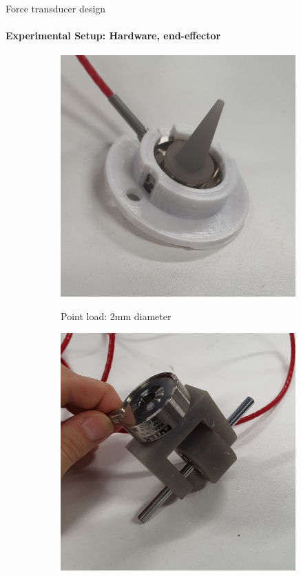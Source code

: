 \documentclass[aspectratio=169]{beamer}
\begin{document}
\begin{frame}[t]{Force transducer design}
    \framesubtitle{Experimental Setup: Hardware, end-effector}
    \begin{figure}[H]
        \begin{subfigure}[t]{0.29\textwidth}
            \centering\includegraphics[width=0.99\textwidth]{point_load.JPG}\\
            \caption*{Point load: 2mm diameter}
            \label{fig:point_load}
        \end{subfigure}
        \begin{subfigure}[t]{0.29\textwidth}
            \centering\includegraphics[width=0.99\textwidth]{rolling_load.JPG}\\

\end{subfigure}
\end{figure}
\end{frame}
\end{document}
